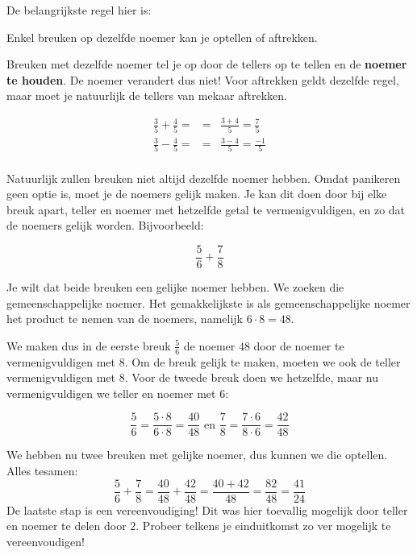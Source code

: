 De belangrijkste regel hier is:

\begin{ftrekenregel}
Enkel breuken op dezelfde noemer kan je optellen of aftrekken.
\end{ftrekenregel}

Breuken met dezelfde noemer tel je op door de tellers op te tellen en de \textbf{noemer te houden}. De noemer verandert dus niet! Voor aftrekken geldt dezelfde regel, maar moet je natuurlijk de tellers van mekaar aftrekken.

\begin{eqnarray*}
\frac{3}{5}+\frac{4}{5}=&=& \frac{3+4}{5}=\frac{7}{5} \\
\frac{3}{5}-\frac{4}{5}=&=& \frac{3-4}{5}=\frac{-1}{5} \\
\end{eqnarray*}

Natuurlijk zullen breuken niet altijd dezelfde noemer hebben. Omdat panikeren geen optie is, moet je de noemers gelijk maken. Je kan dit doen door bij elke breuk apart, teller en noemer met hetzelfde getal te vermenigvuldigen, en zo dat de noemers gelijk worden. Bijvoorbeeld:

\begin{equation*}
\frac{5}{6}+\frac{7}{8}
\end{equation*}

Je wilt dat beide breuken een gelijke noemer hebben. We zoeken die gemeenschappelijke noemer. Het gemakkelijkste is als gemeenschappelijke noemer het product te nemen van de noemers, namelijk $6 \cdot 8=48$.

We maken dus in de eerste breuk $\frac{5}{6}$ de noemer $48$ door de noemer te vermenigvuldigen met $8$. Om de breuk gelijk te maken, moeten we ook de teller vermenigvuldigen met $8$. Voor de tweede breuk  doen we hetzelfde, maar nu vermenigvuldigen we teller en noemer met $6$:

\begin{equation*}
\frac{5}{6}=\frac{5 \cdot 8}{6 \cdot 8} =\frac{40}{48} \text{ en } \frac{7}{8}=\frac{7 \cdot 6}{8 \cdot 6} =\frac{42}{48}
\end{equation*}

We hebben nu twee breuken met gelijke noemer, dus kunnen we die optellen. Alles tesamen:
\begin{equation*}
\frac{5}{6}+\frac{7}{8}=\frac{40}{48}+\frac{42}{48}=\frac{40+42}{48}=\frac{82}{48}=\frac{41}{24}
\end{equation*}
De laatste stap is een vereenvoudiging! Dit was hier toevallig mogelijk door teller en noemer te delen door $2$. 
Probeer telkens je einduitkomst zo ver mogelijk te vereenvoudigen!


